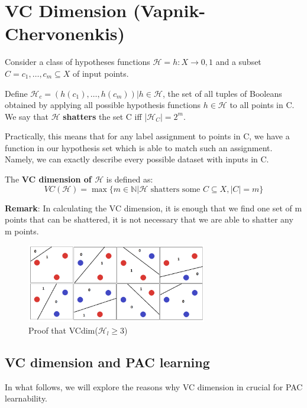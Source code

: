\section{VC Dimension (Vapnik-Chervonenkis)}

Consider a class of hypotheses functions $\mathcal{H} = {h : X \to {0,1}}$ and a subset $C = {c_1,\dots, c_m} \subseteq X$ of input points. 

Define $\mathcal{H}_c = {(h(c_1),\dots, h(c_m))|h \in \mathcal{H}}$, the set of all tuples of Booleans obtained by applying all possible hypothesis functions $h \in \mathcal{H}$ to all points in C. We say that $\mathcal{H}$ \textbf{shatters} the set C iff |$\mathcal{H}_C| = 2^m$. 

Practically, this means that for any label assignment to points in C, we have a function in our hypothesis set which is able to match such an assignment. Namely, we can exactly describe every possible dataset with inputs in C. 

\begin{definitionblock}[VC Dimension]
    The \textbf{VC dimension of $\mathcal{H}$} is defined as:
    $$
    VC(\mathcal{H}) = \max \{m \in \mathbb{N} | \mathcal{H} \text{ shatters some } C \subseteq X, |C| = m\}
    $$
\end{definitionblock}

\textbf{Remark}: In calculating the VC dimension, it is enough that we find one set of m points that can be shattered, it is not necessary that we are able to shatter any m points. 

\begin{figure}[H]
    \centering
    \includegraphics[width=0.7\textwidth]{assets/fig11.png}
    \caption{Proof that VCdim($\mathcal{H}_l \geq 3$)}
    \label{fig:fig11}
\end{figure}

\subsection{VC dimension and PAC learning}

In what follows, we will explore the reasons why VC dimension in crucial for PAC learnability. 


